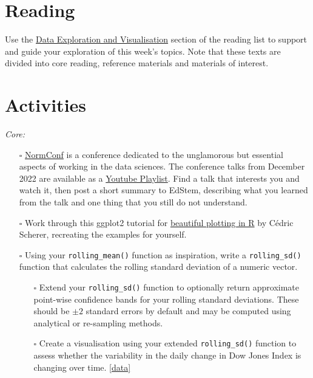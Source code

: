 \documentclass[
  letterpaper,
  DIV=11,
  numbers=noendperiod]{scrreprt}
\begin{document}
\section*{Reading}\label{reading-2}


Use the \hyperref[edav-reading]{Data Exploration and Visualisation}
section of the reading list to support and guide your exploration of
this week's topics. Note that these texts are divided into core reading,
reference materials and materials of interest.

\section*{Activities}\label{activities}


\emph{Core:}

\begin{itemize}
\item[$\square$]
  \href{https://normconf.com/}{NormConf} is a conference dedicated to
  the unglamorous but essential aspects of working in the data sciences.
  The conference talks from December 2022 are available as a
  \href{https://www.youtube.com/@normconf/videos}{Youtube Playlist}.
  Find a talk that interests you and watch it, then post a short summary
  to EdStem, describing what you learned from the talk and one thing
  that you still do not understand.
\item[$\square$]
  Work through this ggplot2 tutorial for
  \href{https://www.cedricscherer.com/2019/08/05/a-ggplot2-tutorial-for-beautiful-plotting-in-r}{beautiful
  plotting in R} by Cédric Scherer, recreating the examples for
  yourself.
\item[$\square$]
  Using your \texttt{rolling\_mean()} function as inspiration, write a
  \texttt{rolling\_sd()} function that calculates the rolling standard
  deviation of a numeric vector.

  \begin{itemize}
  \item[$\square$]
    Extend your \texttt{rolling\_sd()} function to optionally return
    approximate point-wise confidence bands for your rolling standard
    deviations. These should be \(\pm2\) standard errors by default and
    may be computed using analytical or re-sampling methods.
  \item[$\square$]
    Create a visualisation using your extended \texttt{rolling\_sd()}
    function to assess whether the variability in the daily change in
    Dow Jones Index is changing over time.
    \href{data/dowjones.csv}{{[}data{]}}
  \end{itemize}
\end{itemize}
\end{document}
